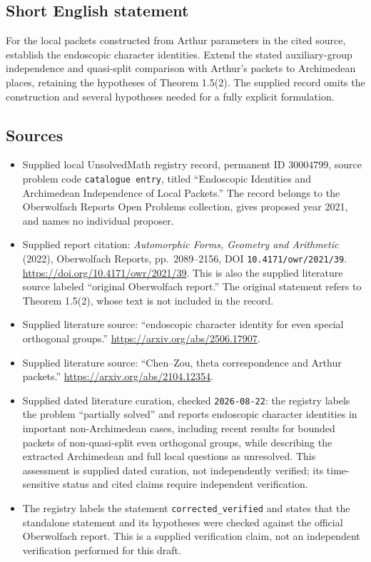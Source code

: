 \documentclass[11pt]{article}
\begin{document}
\subsection{Short English statement}
For the local packets constructed from Arthur parameters in the cited source, establish the endoscopic character identities. Extend the stated auxiliary-group independence and quasi-split comparison with Arthur's packets to Archimedean places, retaining the hypotheses of Theorem 1.5(2). The supplied record omits the construction and several hypotheses needed for a fully explicit formulation.
\subsection{Sources}
\begin{itemize}
\item Supplied local UnsolvedMath registry record, permanent ID \(30004799\), source problem code \texttt{catalogue entry}, titled ``Endoscopic Identities and Archimedean Independence of Local Packets.'' The record belongs to the Oberwolfach Reports Open Problems collection, gives proposed year 2021, and names no individual proposer.
\item Supplied report citation: \emph{Automorphic Forms, Geometry and Arithmetic} (2022), Oberwolfach Reports, pp.~2089--2156, DOI \texttt{10.4171/owr/2021/39}. \url{https://doi.org/10.4171/owr/2021/39}. This is also the supplied literature source labeled ``original Oberwolfach report.'' The original statement refers to Theorem 1.5(2), whose text is not included in the record.
\item Supplied literature source: ``endoscopic character identity for even special orthogonal groups.'' \url{https://arxiv.org/abs/2506.17907}.
\item Supplied literature source: ``Chen--Zou, theta correspondence and Arthur packets.'' \url{https://arxiv.org/abs/2104.12354}.
\item Supplied dated literature curation, checked \texttt{2026-08-22}: the registry labels the problem ``partially solved'' and reports endoscopic character identities in important non-Archimedean cases, including recent results for bounded packets of non-quasi-split even orthogonal groups, while describing the extracted Archimedean and full local questions as unresolved. This assessment is supplied dated curation, not independently verified; its time-sensitive status and cited claims require independent verification.
\item The registry labels the statement \texttt{corrected\_verified} and states that the standalone statement and its hypotheses were checked against the official Oberwolfach report. This is a supplied verification claim, not an independent verification performed for this draft.
\end{itemize}
\end{document}
